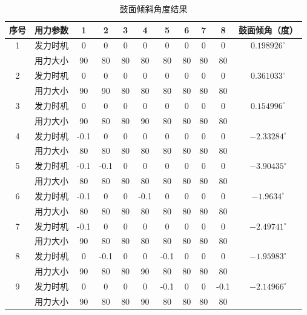 \documentclass{cumcm}
\begin{document}
\begin{table}[H]
\centering
\caption{鼓面倾斜角度结果}\label{table-sym}
\begin{tabular}{|c|c|c|c|c|c|c|c|c|c|c|}
\hline
序号 & 用力参数 & 1    & 2    & 3  & 4    & 5    & 6  & 7  & 8    & 鼓面倾角（度） \\
\hline
1  & 发力时机 & 0    & 0    & 0  & 0    & 0    & 0  & 0  & 0    &   $0.198926^{\circ}$ \\
   & 用力大小 & 90   & 80   & 80 & 80   & 80   & 80 & 80 & 80   &       \\
\hline
2  & 发力时机 & 0    & 0    & 0  & 0    & 0    & 0  & 0  & 0    &    $0.361033^{\circ}$ \\
   & 用力大小 & 90   & 90   & 80 & 80   & 80   & 80 & 80 & 80   &         \\
\hline
3  & 发力时机 & 0    & 0    & 0  & 0    & 0    & 0  & 0  & 0    &    $0.154996^{\circ}$ \\
   & 用力大小 & 90   & 80   & 80 & 90   & 80   & 80 & 80 & 80   &         \\
\hline
4  & 发力时机 & -0.1 & 0    & 0  & 0    & 0    & 0  & 0  & 0    &    $-2.33284^{\circ}$ \\
   & 用力大小 & 80   & 80   & 80 & 80   & 80   & 80 & 80 & 80   &         \\
\hline
5  & 发力时机 & -0.1 & -0.1 & 0  & 0    & 0    & 0  & 0  & 0    &    $-3.90435^{\circ}$ \\
   & 用力大小 & 80   & 80   & 80 & 80   & 80   & 80 & 80 & 80   &         \\
\hline
6  & 发力时机 & -0.1 & 0    & 0  & -0.1 & 0    & 0  & 0  & 0    &    $-1.9634^{\circ}$  \\
   & 用力大小 & 80   & 80   & 80 & 80   & 80   & 80 & 80 & 80   &         \\
\hline
7  & 发力时机 & -0.1 & 0    & 0  & 0    & 0    & 0  & 0  & 0    &    $-2.49741^{\circ}$ \\
   & 用力大小 & 90   & 80   & 80 & 80   & 80   & 80 & 80 & 80   &         \\
\hline
8  & 发力时机 & 0    & -0.1 & 0  & 0    & -0.1 & 0  & 0  & 0    &   $ -1.95983^{\circ}$ \\
   & 用力大小 & 90   & 80   & 80 & 90   & 80   & 80 & 80 & 80   &         \\
\hline
9  & 发力时机 & 0    & 0    & 0  & 0    & -0.1 & 0  & 0  & -0.1 &   $ -2.14966^{\circ}$ \\
   & 用力大小 & 90   & 80   & 80 & 90   & 80   & 80 & 80 & 80   &        \\
\hline
\end{tabular}
\end{table}
\end{document}
